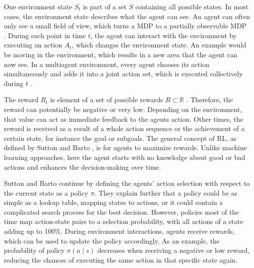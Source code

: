 One environment state $S_t$ is part of a set $S$ containing all possible states. In most cases, the environment state describes what the agent can see. An agent can often only see a small field of view, which turns a MDP to a partially observable MDP \cite{suba18}. During each point in time $t$, the agent can interact with the environment by executing an action $A_t$, which changes the environment state. An example would be moving in the environment, which results in a new area that the agent can now see. In a multiagent environment, every agent chooses its action simultaneously and adds it into a joint action set, which is executed collectively during $t$ \cite{buba10}.

The reward $R_t$ is element of a set of possible rewards $R \subset \mathbb{R}$ \cite{suba18}. Therefore, the reward can potentially be negative or very low. Depending on the environment, that value can act as immediate feedback to the agents action. Other times, the reward is received as a result of a whole action sequence or the achievement of a certain state, for instance the goal or subgoals. The general concept of RL, as defined by Sutton and Barto \cite{suba18}, is for agents to maximize rewards. Unlike machine learning approaches, here the agent starts with no knowledge about good or bad actions and enhances the decision-making over time.

Sutton and Barto continue by defining the agents' action selection with respect to the current state as a policy $\pi$. They explain further that a policy could be as simple as a lookup table, mapping states to actions, or it could contain a complicated search process for the best decision. However, policies most of the time map action-state pairs to a selection probability, with all actions of a state adding up to 100\%.
During environment interactions, agents receive rewards, which can be used to update the policy accordingly. As an example, the probability of policy $\pi(a \mid s)$ decreases when receiving a negative or low reward, reducing the chances of executing the same action in that specific state again.

